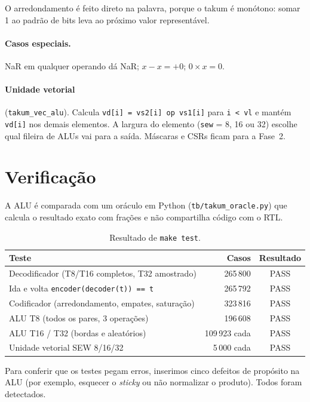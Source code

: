 \documentclass[11pt,a4paper]{article}
\newcommand{\srctrecho}[4]{%
  }
\newcommand{\code}[1]{\texttt{#1}}
\begin{document}
O arredondamento é feito direto na palavra, porque o takum é monótono: somar 1 ao padrão de bits
leva ao próximo valor representável.

\srctrecho{rtl/takum_encoder.v}{57}{62}{arredondamento}

\paragraph{Casos especiais.} NaR em qualquer operando dá NaR; $x - x = +0$; $0 \times x = 0$.

\paragraph{Unidade vetorial} (\code{takum\_vec\_alu}). Calcula \code{vd[i] = vs2[i] op vs1[i]} para
\code{i < vl} e mantém \code{vd[i]} nos demais elementos. A largura do elemento (\code{sew} = 8, 16 ou 32)
escolhe qual fileira de ALUs vai para a saída. Máscaras e CSRs ficam para a Fase~2.

\section{Verificação}

A ALU é comparada com um oráculo em Python (\code{tb/takum\_oracle.py}) que calcula o resultado exato
com frações e não compartilha código com o RTL.

\begin{table}[H]
\centering
\caption{Resultado de \code{make test}.}
\begin{tabular}{lrc}
\toprule
Teste & Casos & Resultado \\
\midrule
Decodificador (T8/T16 completos, T32 amostrado) & 265\,800 & PASS \\
Ida e volta \code{encoder(decoder(t)) == t} & 265\,792 & PASS \\
Codificador (arredondamento, empates, saturação) & 323\,816 & PASS \\
ALU T8 (todos os pares, 3 operações) & 196\,608 & PASS \\
ALU T16 / T32 (bordas e aleatórios) & 109\,923 cada & PASS \\
Unidade vetorial SEW 8/16/32 & 5\,000 cada & PASS \\
\bottomrule
\end{tabular}
\end{table}

Para conferir que os testes pegam erros, inserimos cinco defeitos de propósito na ALU
(por exemplo, esquecer o \emph{sticky} ou não normalizar o produto). Todos foram detectados.
\end{document}
